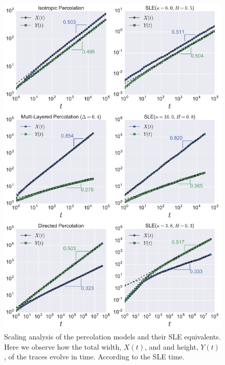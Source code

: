\begin{figure}
\begin{center}
    \includegraphics[scale=0.45]{chapters/ch6-asle/figs/timescaling}
\end{center}
\caption{Scaling analysis of the percolation models and their SLE equivalents.
    Here we observe how the total width, $X(t)$, and and height, $Y(t)$, of the
    traces evolve in time. According to the SLE time.}
\label{fig:timescaling}
\end{figure}




